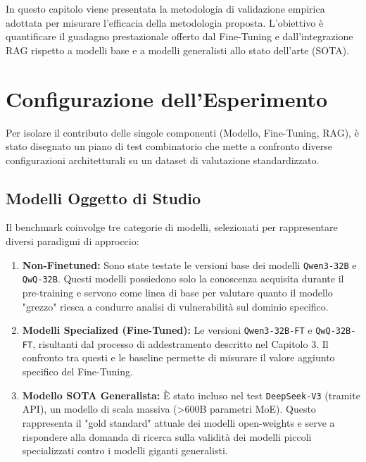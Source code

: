
In questo capitolo viene presentata la metodologia di validazione empirica adottata per misurare l'efficacia della metodologia proposta. L'obiettivo è quantificare il guadagno prestazionale offerto dal Fine-Tuning e dall'integrazione RAG rispetto a modelli base e a modelli generalisti allo stato dell'arte (SOTA).

\section{Configurazione dell'Esperimento}
\label{sec:exp_setup}

Per isolare il contributo delle singole componenti (Modello, Fine-Tuning, RAG), è stato disegnato un piano di test combinatorio che mette a confronto diverse configurazioni architetturali su un dataset di valutazione standardizzato.

\subsection{Modelli Oggetto di Studio}
Il benchmark coinvolge tre categorie di modelli, selezionati per rappresentare diversi paradigmi di approccio:

\begin{enumerate}
    \item \textbf{Non-Finetuned:}
    Sono state testate le versioni base dei modelli \texttt{Qwen3-32B} e \texttt{QwQ-32B}. Questi modelli possiedono solo la conoscenza acquisita durante il pre-training e servono come linea di base per valutare quanto il modello "grezzo" riesca a condurre analisi di vulnerabilità sul dominio specifico.
    
    \item \textbf{Modelli Specialized (Fine-Tuned):}
    Le versioni \texttt{Qwen3-32B-FT} e \texttt{QwQ-32B-FT}, risultanti dal processo di addestramento descritto nel Capitolo 3. Il confronto tra questi e le baseline permette di misurare il valore aggiunto specifico del Fine-Tuning.
    
    \item \textbf{Modello SOTA Generalista:}
    È stato incluso nel test \texttt{DeepSeek-V3} (tramite API), un modello di scala massiva (>600B parametri MoE). Questo rappresenta il "gold standard" attuale dei modelli open-weights e serve a rispondere alla domanda di ricerca sulla validità dei modelli piccoli specializzati contro i modelli giganti generalisti.
\end{enumerate}

